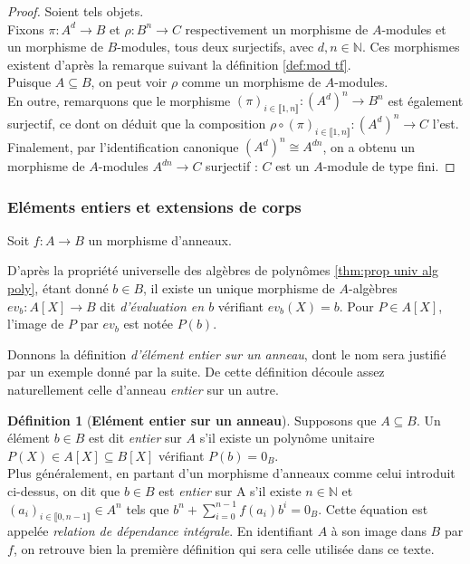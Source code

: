 \documentclass[10pt, twoside]{article}
\theoremstyle{plain}
\theoremstyle{definition}
\newtheorem{definition}[theorem]{Définition}
\theoremstyle{plain}
\theoremstyle{plain}
\theoremstyle{definition}
\theoremstyle{remark}
\begin{document}
\begin{proof}
    Soient tels objets.\\
    Fixons $\pi : A^d \longrightarrow B$ et $\rho : B^n \longrightarrow C$ respectivement un morphisme de $A$-modules et un morphisme de $B$-modules, tous deux surjectifs, avec $d, n \in \mathbb{N}$. Ces morphismes existent d'après la remarque suivant la définition \ref{def:mod tf}.\\
    Puisque $A \subseteq B$, on peut voir $\rho$ comme un morphisme de $A$-modules.\\
    En outre, remarquons que le morphisme $(\pi)_{i \in \llbracket 1, n \rrbracket} : (A^d)^n \longrightarrow B^n$ est également surjectif, ce dont on déduit que la composition $\rho \circ (\pi)_{i \in \llbracket 1, n \rrbracket} : (A^d)^n \longrightarrow C$ l'est.\\
    Finalement, par l'identification canonique $(A^d)^n \cong A^{dn}$, on a obtenu un morphisme de $A$-modules $A^{dn} \longrightarrow C$ surjectif : $C$ est un $A$-module de type fini.
\end{proof}

\subsubsection{Eléments entiers et extensions de corps}

Soit $ f : A \longrightarrow B $ un morphisme d'anneaux. 

D'après la propriété universelle des algèbres de polynômes \ref{thm:prop univ alg poly}, étant donné $b \in B$, il existe un unique morphisme de $A$-algèbres $ev_b : A[X] \longrightarrow B$ dit \textit{d'évaluation en $b$} vérifiant $ev_b(X) = b$. Pour $P \in A[X]$, l'image de $P$ par $ev_b$ est notée $P(b)$.

Donnons la définition \textit{d'élément entier sur un anneau}, dont le nom sera justifié par un exemple donné par la suite. De cette définition découle assez naturellement celle d'anneau \textit{entier} sur un autre.

\begin{definition}[\textbf{Elément entier sur un anneau}]\label{def:entier}
    Supposons que $A \subseteq B$. Un élément $b \in B$ est dit \textit{entier} sur $A$ s'il existe un polynôme unitaire $P(X) \in A[X] \subseteq B[X]$ vérifiant $P(b) = 0_B$.\\
    Plus généralement, en partant d'un morphisme d'anneaux comme celui introduit ci-dessus, on dit que $b \in B$ est \textit{entier} sur A s'il existe $n \in \mathbb{N}$ et $(a_i)_{i \in \llbracket 0, n-1 \rrbracket} \in A^n$ tels que $b^n + \sum\limits_{i = 0}^{n-1} f(a_{i}) b^i = 0_B$. Cette équation est appelée \textit{relation de dépendance intégrale}. En identifiant $A$ à son image dans $B$ par $f$, on retrouve bien la première définition qui sera celle utilisée dans ce texte.
\end{definition} 
\end{document}
